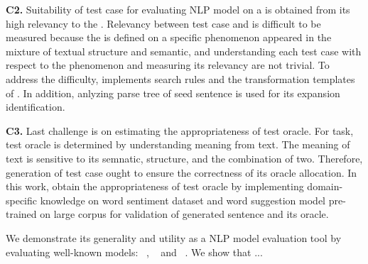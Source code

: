 
\noindent \textbf{C2.} Suitability of test case for evaluating NLP
model on a \lc is obtained from its high relevancy to the
\lc. Relevancy between test case and \lc is difficult to be measured
because the \lc is defined on a specific phenomenon appeared in the
mixture of textual structure and semantic, and understanding each test
case with respect to the phenomenon and measuring its relevancy are
not trivial. To address the difficulty, \tool implements search rules
and the transformation templates of \lcs. In addition, anlyzing parse
tree of seed sentence is used for its expansion identification.

\noindent \textbf{C3.} Last challenge is on estimating the
appropriateness of test oracle. For \sa task, test oracle is
determined by understanding meaning from text. The meaning of text is
sensitive to its semnatic, structure, and the combination of
two. Therefore, generation of test case ought to ensure the
correctness of its oracle allocation. In this work, \tool obtain the
appropriateness of test oracle by implementing domain-specific
knowledge on word sentiment dataset and word suggestion model
pre-trained on large corpus for validation of generated sentence and
its oracle.

We demonstrate its generality and utility as a NLP model evaluation
tool by evaluating well-known \sa models: \Bert~\cite{devlin2019bert},
\Roberta~\cite{liu2019roberta} and \Dbert~\cite{sanh2019distilbert}.
We show that ...




